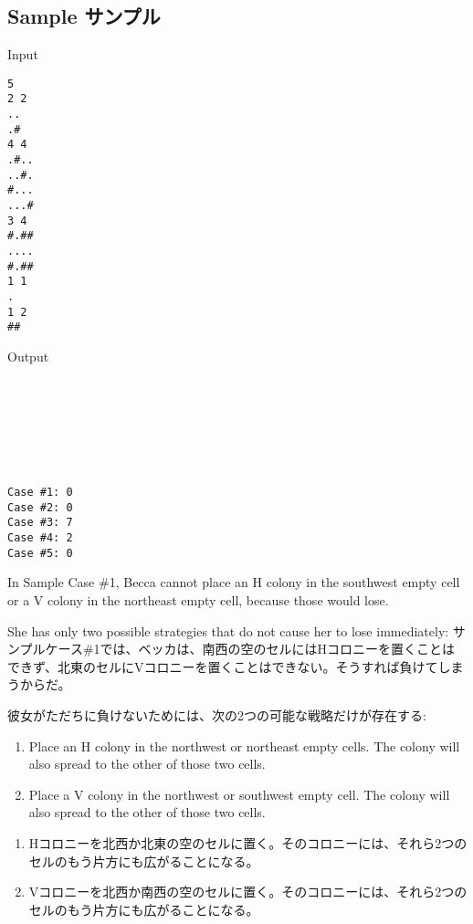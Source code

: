 \documentclass[uplatex,dvipdfmx]{jsarticle} \usepackage{amsmath,amssymb,bm}
\begin{document}
\subsection*{Sample サンプル}
\begin{paracol}{2}
Input

\begin{verbatim}
5
2 2
..
.#
4 4
.#..
..#.
#...
...#
3 4
#.##
....
#.##
1 1
.
1 2
##
\end{verbatim}
\switchcolumn
Output

\begin{verbatim}







Case #1: 0
Case #2: 0
Case #3: 7
Case #4: 2
Case #5: 0
\end{verbatim}
\end{paracol}
\vspace{\baselineskip}
\begin{paracol}{2}
In Sample Case \#1, Becca cannot place an H colony in the southwest empty cell or a V colony in the northeast empty cell, because those would lose.

She has only two possible strategies that do not cause her to lose immediately:
\switchcolumn
サンプルケース\#1では、ベッカは、南西の空のセルにはHコロニーを置くことはできず、北東のセルにVコロニーを置くことはできない。そうすれば負けてしまうからだ。

彼女がただちに負けないためには、次の2つの可能な戦略だけが存在する:
\end{paracol}
\vspace{\baselineskip}
\begin{paracol}{2}
\begin{enumerate}
\item Place an H colony in the northwest or northeast empty cells. The colony will also spread to the other of those two cells.
\item Place a V colony in the northwest or southwest empty cell. The colony will also spread to the other of those two cells.

\end{enumerate}
\switchcolumn
\begin{enumerate}
\item Hコロニーを北西か北東の空のセルに置く。そのコロニーには、それら2つのセルのもう片方にも広がることになる。
\item Vコロニーを北西か南西の空のセルに置く。そのコロニーには、それら2つのセルのもう片方にも広がることになる。
\end{enumerate}
\end{paracol}
\end{document}
